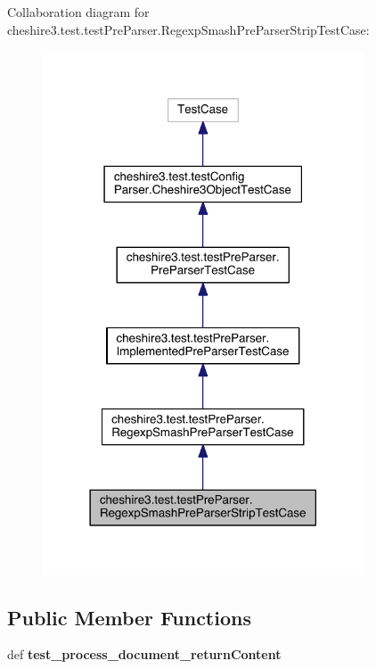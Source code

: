 Collaboration diagram for cheshire3.\-test.\-test\-Pre\-Parser.\-Regexp\-Smash\-Pre\-Parser\-Strip\-Test\-Case\-:
\nopagebreak
\begin{figure}[H]
\begin{center}
\leavevmode
\includegraphics[width=270pt]{classcheshire3_1_1test_1_1test_pre_parser_1_1_regexp_smash_pre_parser_strip_test_case__coll__graph}
\end{center}
\end{figure}
\subsection*{Public Member Functions}
\begin{DoxyCompactItemize}
\item 
\hypertarget{classcheshire3_1_1test_1_1test_pre_parser_1_1_regexp_smash_pre_parser_strip_test_case_a1fa1927fe5642c78ceb188ede7fb2814}{def {\bfseries test\-\_\-process\-\_\-document\-\_\-return\-Content}}\label{classcheshire3_1_1test_1_1test_pre_parser_1_1_regexp_smash_pre_parser_strip_test_case_a1fa1927fe5642c78ceb188ede7fb2814}

\end{DoxyCompactItemize}
